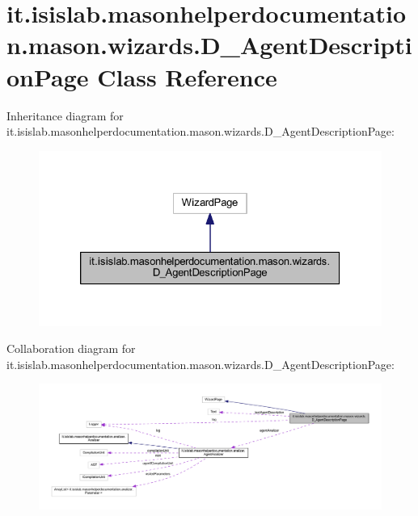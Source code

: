 \hypertarget{classit_1_1isislab_1_1masonhelperdocumentation_1_1mason_1_1wizards_1_1_d___agent_description_page}{\section{it.\-isislab.\-masonhelperdocumentation.\-mason.\-wizards.\-D\-\_\-\-Agent\-Description\-Page Class Reference}
\label{classit_1_1isislab_1_1masonhelperdocumentation_1_1mason_1_1wizards_1_1_d___agent_description_page}
}


Inheritance diagram for it.\-isislab.\-masonhelperdocumentation.\-mason.\-wizards.\-D\-\_\-\-Agent\-Description\-Page\-:\nopagebreak
\begin{figure}[H]
\begin{center}
\leavevmode
\includegraphics[width=326pt]{classit_1_1isislab_1_1masonhelperdocumentation_1_1mason_1_1wizards_1_1_d___agent_description_page__inherit__graph}
\end{center}
\end{figure}


Collaboration diagram for it.\-isislab.\-masonhelperdocumentation.\-mason.\-wizards.\-D\-\_\-\-Agent\-Description\-Page\-:\nopagebreak
\begin{figure}[H]
\begin{center}
\leavevmode
\includegraphics[width=350pt]{classit_1_1isislab_1_1masonhelperdocumentation_1_1mason_1_1wizards_1_1_d___agent_description_page__coll__graph}
\end{center}
\end{figure}
